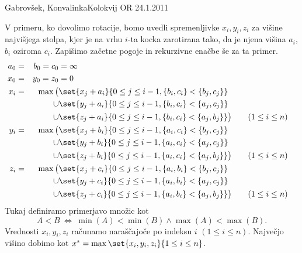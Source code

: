 \begin{naloga}{Gabrovšek, Konvalinka}{Kolokvij OR 24.1.2011}
\begin{odgovor}
V primeru, ko dovolimo rotacije,
bomo uvedli spremenljivke $x_i, y_i, z_i$ za višine najvišjega stolpa,
kjer je na vrhu $i$-ta kocka zarotirana tako,
da je njena višina $a_i$, $b_i$ oziroma $c_i$.
Zapišimo začetne pogoje in rekurzivne enačbe še za ta primer.
\begin{alignat*}{3}
a_0 &=&{} b_0 = c_0 &= \infty \\
x_0 &=&{} y_0 = z_0 &= 0 \\
x_i &=&{} \max
  \big(&{} \set{x_j + a_i}{0 \le j \le i-1, \{b_i, c_i\} < \{b_j, c_j\}} \\
&&\cup &{} \set{y_j + a_i}{0 \le j \le i-1, \{b_i, c_i\} < \{a_j, c_j\}} \\
&&\cup &{} \set{z_j + a_i}{0 \le j \le i-1, \{b_i, c_i\} < \{a_j, b_j\}}\big)
&&\quad (1 \le i \le n) \\
y_i &=&{} \max
  \big(&{} \set{x_j + b_i}{0 \le j \le i-1, \{a_i, c_i\} < \{b_j, c_j\}} \\
&&\cup &{} \set{y_j + b_i}{0 \le j \le i-1, \{a_i, c_i\} < \{a_j, c_j\}} \\
&&\cup &{} \set{z_j + b_i}{0 \le j \le i-1, \{a_i, c_i\} < \{a_j, b_j\}}\big)
&&\quad (1 \le i \le n) \\
z_i &=&{} \max
  \big(&{} \set{x_j + c_i}{0 \le j \le i-1, \{a_i, b_i\} < \{b_j, c_j\}} \\
&&\cup &{} \set{y_j + c_i}{0 \le j \le i-1, \{a_i, b_i\} < \{a_j, c_j\}} \\
&&\cup &{} \set{z_j + c_i}{0 \le j \le i-1, \{a_i, b_i\} < \{a_j, b_j\}}\big)
&&\quad (1 \le i \le n)
\end{alignat*}
Tukaj definiramo primerjavo množic kot
$$
A < B \ \Leftrightarrow \ \min(A) < \min(B) \land \max(A) < \max(B) .
$$
Vrednosti $x_i, y_i, z_i$ računamo naraščajoče po indeksu $i$ $(1 \le i \le n)$.
Največjo višino dobimo kot $x^* = \max\set{x_i, y_i, z_i}{1 \le i \le n}$.
\end{odgovor}
\end{naloga}
